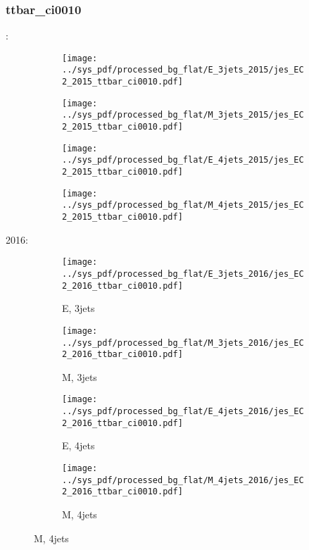 \documentclass{beamer}
\begin{document}
\begin{frame}
\frametitle{ttbar_ci0010}
\fontsize{5}{1}:
\begin{figure}
\centering
\begin{subfigure}[b]{0.24\textwidth}
\texttt{[image: ../sys\_pdf/processed\_bg\_flat/E\_3jets\_2015/jes\_EC2\_2015\_ttbar\_ci0010.pdf]}
\end{subfigure}
\begin{subfigure}[b]{0.24\textwidth}
\texttt{[image: ../sys\_pdf/processed\_bg\_flat/M\_3jets\_2015/jes\_EC2\_2015\_ttbar\_ci0010.pdf]}
\end{subfigure}
\begin{subfigure}[b]{0.24\textwidth}
\texttt{[image: ../sys\_pdf/processed\_bg\_flat/E\_4jets\_2015/jes\_EC2\_2015\_ttbar\_ci0010.pdf]}
\end{subfigure}
\begin{subfigure}[b]{0.24\textwidth}
\texttt{[image: ../sys\_pdf/processed\_bg\_flat/M\_4jets\_2015/jes\_EC2\_2015\_ttbar\_ci0010.pdf]}
\end{subfigure}
\end{figure}
2016:
\begin{figure}
\centering
\begin{subfigure}[b]{0.24\textwidth}
\texttt{[image: ../sys\_pdf/processed\_bg\_flat/E\_3jets\_2016/jes\_EC2\_2016\_ttbar\_ci0010.pdf]}
\captionsetup{font=tiny}
\caption{E, 3jets}
\end{subfigure}
\begin{subfigure}[b]{0.24\textwidth}
\texttt{[image: ../sys\_pdf/processed\_bg\_flat/M\_3jets\_2016/jes\_EC2\_2016\_ttbar\_ci0010.pdf]}
\captionsetup{font=tiny}
\caption{M, 3jets}
\end{subfigure}
\begin{subfigure}[b]{0.24\textwidth}
\texttt{[image: ../sys\_pdf/processed\_bg\_flat/E\_4jets\_2016/jes\_EC2\_2016\_ttbar\_ci0010.pdf]}
\captionsetup{font=tiny}
\caption{E, 4jets}
\end{subfigure}
\begin{subfigure}[b]{0.24\textwidth}
\texttt{[image: ../sys\_pdf/processed\_bg\_flat/M\_4jets\_2016/jes\_EC2\_2016\_ttbar\_ci0010.pdf]}
\captionsetup{font=tiny}
\caption{M, 4jets}
\end{subfigure}
\end{figure}
\end{frame}
\end{document}
